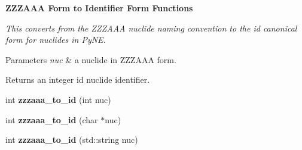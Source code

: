 \begin{Indent}{\bf Z\-Z\-Z\-A\-A\-A Form to Identifier Form Functions}\par
{\em This converts from the Z\-Z\-Z\-A\-A\-A nuclide naming convention to the id canonical form for nuclides in Py\-N\-E. 
\begin{DoxyParams}{Parameters}
{\em nuc} & a nuclide in Z\-Z\-Z\-A\-A\-A form. \\
\hline
\end{DoxyParams}
\begin{DoxyReturn}{Returns}
an integer id nuclide identifier. 
\end{DoxyReturn}
}\begin{DoxyCompactItemize}
\item 
\hypertarget{namespacepyne_1_1nucname_a655aba032448b6a33135b0e7a49e98ad}{int {\bfseries zzzaaa\-\_\-to\-\_\-id} (int nuc)}\label{namespacepyne_1_1nucname_a655aba032448b6a33135b0e7a49e98ad}

\item 
\hypertarget{namespacepyne_1_1nucname_a0d5b73fca1bf6ccc86c6b34647a8fb2d}{int {\bfseries zzzaaa\-\_\-to\-\_\-id} (char $\ast$nuc)}\label{namespacepyne_1_1nucname_a0d5b73fca1bf6ccc86c6b34647a8fb2d}

\item 
\hypertarget{namespacepyne_1_1nucname_a1d83a3f4a7cdc8b712077bfb9a5a1963}{int {\bfseries zzzaaa\-\_\-to\-\_\-id} (std\-::string nuc)}\label{namespacepyne_1_1nucname_a1d83a3f4a7cdc8b712077bfb9a5a1963}

\end{DoxyCompactItemize}
\end{Indent}
